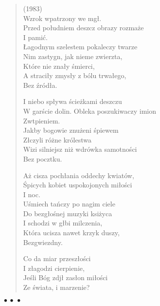\documentclass{article} %
\newenvironment{wierszd}[2]
	{\begin{verse} \hspace*{-1em}{\bf #1}\hfill{\small{(#2)}}\\[.5ex] }
	{\end{verse} \begin{center}$\bullet\ \bullet\ \bullet$\end{center}}
\newcommand{\e}{\eob}
\renewcommand{\a}{\aob}
\renewcommand{\o}{\'{o}}
\newcommand{\z}{\'{z}}
\newcommand{\n}{\'{n}}
\newcommand{\s}{\'{s}}
\renewcommand{\S}{\'{S}}
\newcommand{\ci}{\'{c}}
\begin{document}
%
 \newpage

\begin{wierszd}{}{1983}

Wzrok wpatrzony we mg{\l}{\e}. \\ 
Przed po{\l}udniem deszcz obrazy rozma\.{z}e \\ 
I pami{\e}{\ci}. \\ 
{\L}agodnym szelestem pokaleczy twarze \\ 
Nim zastygn{\a}, jak nieme zwierz{\e}ta, \\ 
Kt{\o}re nie zna{\l}y {\s}mierci, \\ 
A straci{\l}y zmys{\l}y z b{\o}lu trwa{\l}ego, \\ 
Bez {\z}r{\o}d{\l}a. 

I niebo sp{\l}ywa {\s}cie\.{z}kami deszczu  \\ 
W gar{\s}cie dolin. Obleka poszukiwaczy imion \\ 
Zw{\a}tpieniem. \\ 
Jakby bogowie znu\.{z}eni {\s}piewem \\ 
Z{\l}{\a}czyli r{\o}\.{z}ne kr{\o}lestwa \\ 
Wi{\e}zi{\a} silniejsz{\a} ni\.{z} w{\e}dr{\o}wka samotno{\s}ci \\ 
Bez pocz{\a}tku.  

A\.{z} cisza poch{\l}ania oddechy kwiat{\o}w, \\ 
{\S}pi{\a}cych kobiet uspokojonych mi{\l}o{\s}ci{\a} \\ 
I noc{\a}. \\ 
U{\s}miech ta{\n}czy po nagim ciele \\ 
Do bezg{\l}o{\s}nej muzyki ksi{\e}\.{z}yca \\ 
I schodzi w g{\l}{\e}bi{\e} milczenia, \\ 
Kt{\o}ra ucisza nawet krzyk duszy, \\ 
Bezgwiezdny. 

Co da miar{\e} przesz{\l}o{\s}ci \\ 
I z{\l}agodzi cierpienie, \\ 
Je{\s}li B{\o}g zdj{\a}{\l} zas{\l}on{\e} mi{\l}o{\s}ci \\ 
Ze {\s}wiata, i marzenie? 

\end{wierszd}
\end{document}
